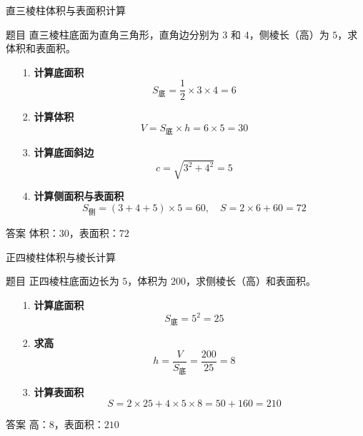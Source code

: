 


\begin{frame}{直三棱柱体积与表面积计算}
    \begin{block}{题目}
      直三棱柱底面为直角三角形，直角边分别为 \(3\) 和 \(4\)，侧棱长（高）为 \(5\)，求体积和表面积。
    \end{block}
  \pause
    \begin{enumerate}
      \item[1.] \textbf{计算底面积}  
        \[
        S_{\text{底}} = \frac{1}{2} \times 3 \times 4 = 6
        \]
      \item[2.] \textbf{计算体积}  
        \[
        V = S_{\text{底}} \times h = 6 \times 5 = 30
        \]
      \item[3.] \textbf{计算底面斜边}  
        \[
        c = \sqrt{3^2 + 4^2} = 5
        \]
      \item[4.] \textbf{计算侧面积与表面积}  
        \[
        S_{\text{侧}} = (3 + 4 + 5) \times 5 = 60, \quad S = 2 \times 6 + 60 = 72
        \]
    \end{enumerate}
  
    \begin{exampleblock}{答案}
      体积：\(\boxed{30}\)，表面积：\(\boxed{72}\)
    \end{exampleblock}
  \end{frame}
  
  \begin{frame}{正四棱柱体积与棱长计算}
    \begin{block}{题目}
      正四棱柱底面边长为 \(5\)，体积为 \(200\)，求侧棱长（高）和表面积。
    \end{block}
  \pause
    \begin{enumerate}
      \item[1.] \textbf{计算底面积}  
        \[
        S_{\text{底}} = 5^2 = 25
        \]
      \item[2.] \textbf{求高}  
        \[
        h = \frac{V}{S_{\text{底}}} = \frac{200}{25} = 8
        \]
      \item[3.] \textbf{计算表面积}  
        \[
        S = 2 \times 25 + 4 \times 5 \times 8 = 50 + 160 = 210
        \]
    \end{enumerate}
  
    \begin{exampleblock}{答案}
      高：\(\boxed{8}\)，表面积：\(\boxed{210}\)
    \end{exampleblock}
  \end{frame}
  
